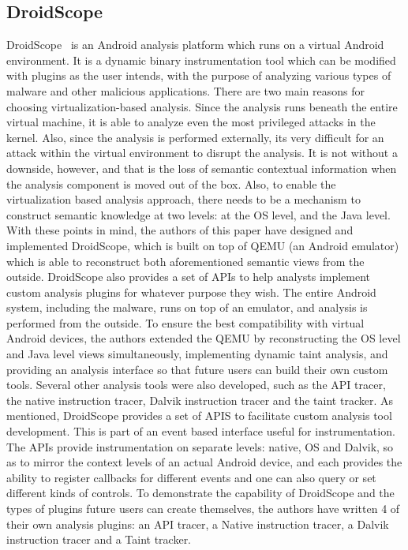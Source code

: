 \documentclass[11pt]{article}
\begin{document}
	\subsection{DroidScope}
	DroidScope~\cite{yan2012droidscope} is an Android analysis platform which runs on a virtual Android environment. It is a dynamic binary instrumentation tool which can be modified with plugins as the user intends, with the purpose of analyzing various types of malware and other malicious applications. There are two main reasons for choosing virtualization-based analysis. Since the analysis runs beneath the entire virtual machine, it is able to analyze even the most privileged attacks in the kernel. Also, since the analysis is performed externally, its very difficult for an attack within the virtual environment to disrupt the analysis. It is not without a downside, however, and that is the loss of semantic contextual information when the analysis component is moved out of the box. Also, to enable the virtualization based analysis approach, there needs to be a mechanism to construct semantic knowledge at two levels: at the OS level, and the Java level. With these points in mind, the authors of this paper have designed and implemented DroidScope, which is built on top of QEMU (an Android emulator) which is able to reconstruct both aforementioned semantic views from the outside. DroidScope also provides a set of APIs to help analysts implement custom analysis plugins for whatever purpose they wish.
	The entire Android system, including the malware, runs on top of an emulator, and analysis is performed from the outside. To ensure the best compatibility with virtual Android devices, the authors extended the QEMU by reconstructing the OS level and Java level views simultaneously, implementing dynamic taint analysis, and providing an analysis interface so that future users can build their own custom tools. Several other analysis tools were also developed, such as the API tracer, the native instruction tracer, Dalvik instruction tracer and the taint tracker.
	As mentioned, DroidScope provides a set of APIS to facilitate custom analysis tool development. This is part of an event based interface useful for instrumentation. The APIs provide instrumentation on separate levels: native, OS and Dalvik, so as to mirror the context levels of an actual Android device, and each provides the ability to register callbacks for different events and one can also query or set different kinds of controls. To demonstrate the capability of DroidScope and the types of plugins future users can create themselves, the authors have written 4 of their own analysis plugins: an API tracer, a Native instruction tracer, a Dalvik instruction tracer and a Taint tracker.
	
\end{document}
